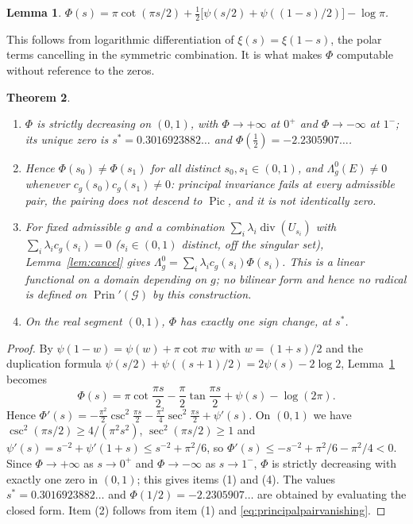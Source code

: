 \documentclass[11pt]{amsart}
\newtheorem{theorem}{Theorem}[section]
\newtheorem{lemma}[theorem]{Lemma}
\theoremstyle{definition}
\theoremstyle{remark}
\newcommand{\divv}{\operatorname{div}}
\newcommand{\Prin}{\operatorname{Prin}}
\newcommand{\Gr}{\mathcal G}
\begin{document}
\begin{lemma}\label{lem:phipsi}
$\Phi(s)=\pi\cot(\pi s/2)+\tfrac12\big[\psi(s/2)+\psi((1-s)/2)\big]-\log\pi$.
\end{lemma}

This follows from logarithmic differentiation of $\xi(s)=\xi(1-s)$, the polar
terms cancelling in the symmetric combination.  It is what makes $\Phi$
computable without reference to the zeros.

\begin{theorem}\label{thm:principalradical}
\begin{enumerate}
\item $\Phi$ is strictly decreasing on $(0,1)$, with $\Phi\to+\infty$ at
$0^+$ and $\Phi\to-\infty$ at $1^-$; its unique zero is
$s^\ast=0.3016923882\ldots$ and $\Phi(\tfrac12)=-2.2305907\ldots$.
\item Hence $\Phi(s_0)\ne\Phi(s_1)$ for all distinct $s_0,s_1\in(0,1)$, and
$\Lambda_g^0(E)\ne0$ whenever $c_g(s_0)c_g(s_1)\ne0$: principal invariance
fails at every admissible pair, the pairing does not descend to
$\operatorname{Pic}$, and it is not identically zero.
\item For fixed admissible $g$ and a combination
$\sum_i\lambda_i\divv(U_{s_i})$ with $\sum_i\lambda_ic_g(s_i)=0$
($s_i\in(0,1)$ distinct, off the singular set), Lemma~\ref{lem:cancel} gives
$\Lambda_g^0=\sum_i\lambda_ic_g(s_i)\Phi(s_i)$.  This is a linear functional
on a domain depending on $g$; no bilinear form and hence no radical is
defined on $\Prin'(\Gr)$ by this construction.
\item On the real segment $(0,1)$, $\Phi$ has exactly one sign change, at
$s^{\ast}$.
\end{enumerate}
\end{theorem}

\begin{proof}
By $\psi(1-w)=\psi(w)+\pi\cot\pi w$ with $w=(1+s)/2$ and the duplication
formula $\psi(s/2)+\psi((s+1)/2)=2\psi(s)-2\log2$, Lemma~\ref{lem:phipsi}
becomes
\[
 \Phi(s)=\pi\cot\frac{\pi s}2-\frac\pi2\tan\frac{\pi s}2+\psi(s)-\log(2\pi).
\]
Hence $\Phi'(s)=-\frac{\pi^2}{2}\csc^2\frac{\pi s}2-\frac{\pi^2}4\sec^2\frac{\pi
s}2+\psi'(s)$.  On $(0,1)$ we have $\csc^2(\pi s/2)\ge 4/(\pi^2s^2)$,
$\sec^2(\pi s/2)\ge1$ and $\psi'(s)=s^{-2}+\psi'(1+s)\le s^{-2}+\pi^2/6$, so
$\Phi'(s)\le -s^{-2}+\pi^2/6-\pi^2/4<0$.  Since $\Phi\to+\infty$ as
$s\to0^+$ and $\Phi\to-\infty$ as $s\to1^-$, $\Phi$ is strictly decreasing
with exactly one zero in $(0,1)$; this gives items (1) and (4).  The
values $s^{\ast}=0.3016923882\ldots$ and $\Phi(1/2)=-2.2305907\ldots$ are
obtained by evaluating the closed form.  Item (2) follows from item (1) and
\eqref{eq:principalpairvanishing}.
\end{proof}
\end{document}
